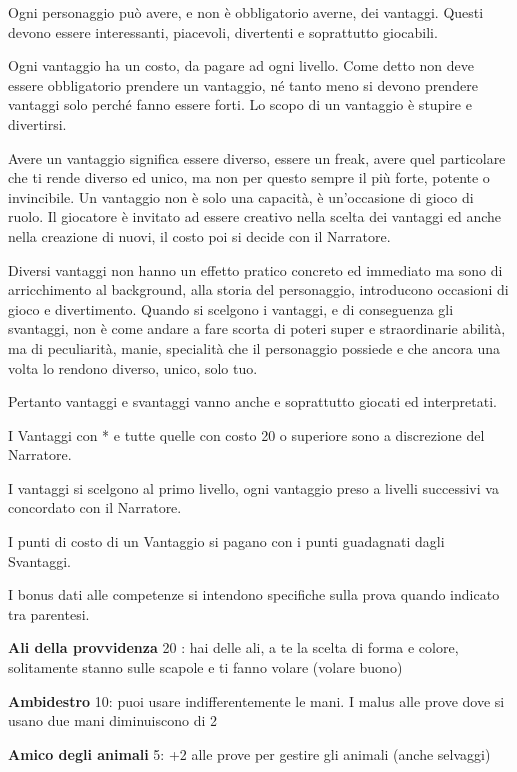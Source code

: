 \documentclass[a4paper,11pt,twoside,openany]{book}
\begin{document}
\bigskip

Ogni personaggio può avere, e non è obbligatorio averne, dei vantaggi. Questi devono essere interessanti, piacevoli, divertenti e soprattutto giocabili.

Ogni vantaggio ha un costo, da pagare ad ogni livello. Come detto non deve essere obbligatorio prendere un vantaggio, né tanto meno si devono prendere vantaggi solo perché fanno essere forti. Lo scopo di un vantaggio è stupire e divertirsi. 

Avere un vantaggio significa essere diverso, essere un freak, avere quel particolare che ti rende diverso ed unico, ma non per questo sempre il più forte, potente o invincibile. Un vantaggio non è solo una capacità, è un'occasione di gioco di ruolo. Il giocatore è invitato ad essere creativo nella scelta dei vantaggi ed anche nella creazione di nuovi, il costo poi si decide con il Narratore.

Diversi vantaggi non hanno un effetto pratico concreto ed immediato ma sono di arricchimento al background, alla storia del personaggio, introducono occasioni di gioco e divertimento. Quando si scelgono i vantaggi, e di conseguenza gli svantaggi, non è come andare a fare scorta di poteri super e straordinarie abilità, ma di peculiarità, manie, specialità che il personaggio possiede e che ancora una volta lo rendono diverso, unico, solo tuo. 

Pertanto vantaggi e svantaggi vanno anche e soprattutto giocati ed interpretati.

I Vantaggi con {*} e tutte quelle con costo 20 o superiore sono a discrezione del Narratore.

I vantaggi si scelgono al primo livello, ogni vantaggio preso a livelli successivi va concordato con il Narratore.

I punti di costo di un Vantaggio si pagano con i punti guadagnati dagli Svantaggi.

I bonus dati alle competenze si intendono specifiche sulla prova quando indicato tra parentesi.

\bigskip

\textbf{Ali della provvidenza} 20 : hai delle ali, a te la scelta di forma e colore, solitamente stanno sulle scapole e ti fanno volare (volare buono)

\textbf{Ambidestro}\label{Ambidestro} 10: puoi usare indifferentemente le mani. I malus alle prove dove si usano due mani diminuiscono di 2

\textbf{Amico degli animali} 5: +2 alle prove per gestire gli animali (anche selvaggi)
\end{document}

